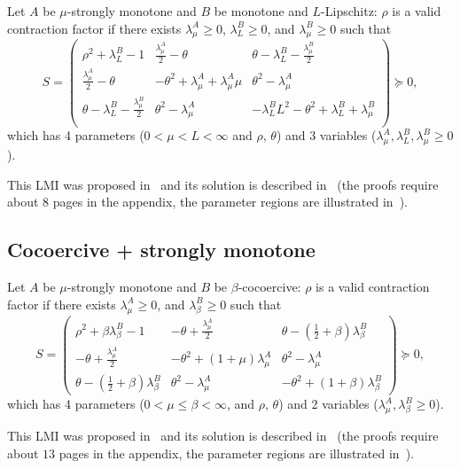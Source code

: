\documentclass{article}
\renewcommand{\leq}{\leqslant}
\renewcommand{\geq}{\geqslant}
\renewcommand{\succeq}{\succcurlyeq}
\begin{document}
Let $A$ be $\mu$-strongly monotone and $B$ be monotone and $L$-Lipschitz: $\rho$ is a valid contraction factor if there exists  $\lambda^A_\mu\geq 0$, $\lambda^B_L\geq 0$, and $\lambda^B_\mu\geq 0$ such that
\[ S= \begin{pmatrix}\rho ^2+\lambda^B_L-1 & \frac{\lambda^A_\mu}{2}-\theta  & \theta -\lambda^B_L-\frac{\lambda^B_\mu}{2} \\
 \frac{\lambda^A_\mu}{2}-\theta  & -\theta ^2+\lambda^A_\mu+\lambda^A_\mu \mu  & \theta ^2-\lambda^A_\mu \\
 \theta -\lambda^B_L-\frac{\lambda^B_\mu}{2} & \theta ^2-\lambda^A_\mu & -\lambda^B_L L^2-\theta ^2+\lambda^B_L+\lambda^B_\mu \\
\end{pmatrix}\succeq 0,
\]
which has 4 parameters ($0<\mu<L<\infty$ and $\rho$, $\theta$) and 3 variables ($\lambda^A_\mu,\lambda^B_L,\lambda^B_\mu\geq0$).

This LMI was proposed in~\cite[SM3.2.1]{ryu2020operator} and its solution is described in~\cite[Theorem 4.3]{ryu2020operator} (the proofs require about $8$ pages in the appendix, the parameter regions are illustrated in~\cite[Figure 4]{ryu2020operator}).

\subsection{Cocoercive + strongly monotone}
Let $A$ be $\mu$-strongly monotone and $B$ be $\beta$-cocoercive: $\rho$ is a valid contraction factor if there exists $\lambda^A_\mu\geq 0$, and $\lambda_\beta^B\geq 0$ such that
\[
S=\begin{pmatrix}
\rho ^2+\beta  \lambda_\beta^B-1 & -\theta+\frac{\lambda^A_\mu}{2}  & \theta -(\frac{1}{2}+\beta)\lambda_\beta^B \\
 -\theta+\frac{\lambda^A_\mu}{2}  & -\theta ^2+(1+\mu)\lambda^A_\mu  & \theta ^2-\lambda^A_\mu \\
 \theta -(\frac{1}{2}+\beta)\lambda_\beta^B & \theta ^2-\lambda^A_\mu & -\theta ^2+(1+\beta)\lambda_\beta^B 
\end{pmatrix}
\succeq 0,
\]
which has 4 parameters ($0< \mu\leq \beta<\infty$, and $\rho$, $\theta$) and 2 variables ($\lambda^A_\mu,\lambda_\beta^B\geq0$).

This LMI was proposed in~\cite[SM3.1.1.]{ryu2020operator} and its solution is described in~\cite[Theorem 4.1]{ryu2020operator} (the proofs require about $13$ pages in the appendix, the parameter regions are illustrated in~\cite[Figure 3]{ryu2020operator}).

{}

\end{document}
